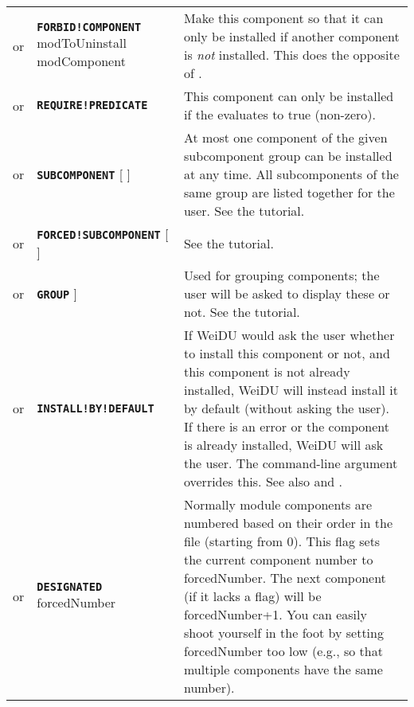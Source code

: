 \documentclass{article}
\def\ttref#1{\ahrefloc{#1}{\tt #1}}
\def\DEFINE#1{{\tt \bf #1}\label{#1}\index{#1}}
\def\DEFSYN#1{{\tt \bf #1}\index{#1}}
\def\Ob{{\color{red} [ }}
\def\Oe{{\color{red} ] }}
\begin{document}
\begin{tabular}{cp{10in}|p{10in}}
  or & \DEFINE{FORBID!COMPONENT} modToUninstall modComponent
      \ttref{String} &
      Make this component so that it can only be installed if another
      component is \emph{not} installed. This does the opposite of
      \ttref{REQUIRE!COMPONENT}.  \\

  or & \DEFINE{REQUIRE!PREDICATE} \ttref{value} \ttref{String} &
      This component can only be installed if the \ttref{value}
      evaluates to true (non-zero). \\

  or & \DEFSYN{SUBCOMPONENT} \ttref{String} \Ob \ttref{value} \Oe &
      At most one component of the given subcomponent group can be
      installed at any time. All subcomponents of the same group are
      listed together for the user. See the \ttref{SUBCOMPONENT}
      tutorial. \\

  or & \DEFINE{FORCED!SUBCOMPONENT} \ttref{String} \Ob \ttref{value} \Oe &
      See the \ttref{SUBCOMPONENT} tutorial. \\

  or & \DEFSYN{GROUP} \ttref{String}\Ob \ttref{value} \Oe & Used for grouping components; the user
      will be asked to display these or not. See the \ttref{GROUP} tutorial. \\

  or & \DEFINE{INSTALL!BY!DEFAULT} &
      If WeiDU would ask the user whether to install this component or not,
      and this component is not already installed, WeiDU will instead
      install it by default (without asking the user). If there is an error
      or the component is already installed, WeiDU will ask the user. The
      \ttref{--uninstall} command-line argument overrides this. See also
      \ttref{REQUIRE!COMPONENT} and \ttref{ALWAYS}.  \\

  or & \DEFINE{DESIGNATED} forcedNumber &
      Normally module components are numbered based on their order in the
      \ttref{TP2} file (starting from 0). This flag sets the current
      component number to forcedNumber. The next component (if it lacks a
      \ttref{DESIGNATED} flag) will be forcedNumber+1. You can easily shoot
      yourself in the foot by setting forcedNumber too low (e.g., so that
      multiple components have the same number). \\


\end{tabular}
\end{document}
